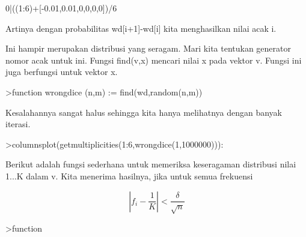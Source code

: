 \documentclass[a4paper,10pt]{article}
\begin{document}
\begin{eulernotebook}
\begin{eulercomment}
\begin{eulercomment}
\begin{eulercomment}
\begin{eulercomment}
\begin{eulercomment}
\begin{eulercomment}
\begin{eulercomment}
\begin{eulercomment}
\begin{eulercomment}
\begin{eulercomment}
\begin{eulercomment}
\begin{eulercomment}
\begin{eulercomment}
\begin{eulercomment}
\begin{eulercomment}
\begin{eulercomment}
\begin{eulercomment}
\begin{eulercomment}
\begin{eulercomment}
\begin{eulercomment}
\begin{eulercomment}
\begin{eulercomment}
\begin{eulercomment}
\begin{eulercomment}
\begin{eulercomment}
\begin{eulercomment}
\begin{eulercomment}
\begin{eulercomment}
\begin{eulercomment}
\begin{eulercomment}
\begin{eulercomment}
\begin{eulercomment}
\begin{eulercomment}
\begin{eulercomment}
\begin{eulercomment}
\begin{eulercomment}
\begin{eulercomment}
\begin{eulercomment}
\begin{eulercomment}
\begin{eulercomment}
\begin{eulercomment}
\begin{eulercomment}
\begin{eulercomment}
\begin{eulercomment}
\begin{eulercomment}
\begin{eulercomment}
\begin{eulercomment}
\begin{eulercomment}
\begin{eulercomment}
\begin{eulercomment}
\begin{eulercomment}
\begin{eulercomment}
\begin{eulercomment}
\begin{eulercomment}
\begin{eulercomment}
\begin{eulercomment}
\begin{eulercomment}
\begin{eulercomment}
\begin{eulercomment}
\begin{eulercomment}
\begin{eulercomment}
\begin{eulercomment}
\begin{eulercomment}
\begin{eulercomment}
\begin{eulercomment}
\begin{eulercomment}
\begin{eulerprompt}
0|((1:6)+[-0.01,0.01,0,0,0,0])/6
\end{eulerprompt}
\begin{euleroutput}
  [0,  0.165,  0.335,  0.5,  0.666667,  0.833333,  1]
\end{euleroutput}
\begin{eulercomment}
Artinya dengan probabilitas wd[i+1]-wd[i] kita menghasilkan nilai acak
i.

Ini hampir merupakan distribusi yang seragam. Mari kita tentukan
generator nomor acak untuk ini. Fungsi find(v,x) mencari nilai x pada
vektor v. Fungsi ini juga berfungsi untuk vektor x.
\end{eulercomment}
\begin{eulerprompt}
>function wrongdice (n,m) := find(wd,random(n,m))
\end{eulerprompt}
\begin{eulercomment}
Kesalahannya sangat halus sehingga kita hanya melihatnya dengan banyak
iterasi.
\end{eulercomment}
\begin{eulerprompt}
>columnsplot(getmultiplicities(1:6,wrongdice(1,1000000))):
\end{eulerprompt}
\begin{eulercomment}
Berikut adalah fungsi sederhana untuk memeriksa keseragaman distribusi
nilai 1...K dalam v. Kita menerima hasilnya, jika untuk semua
frekuensi

\end{eulercomment}
\begin{eulerformula}
\[
\left|f_i-\frac{1}{K}\right| < \frac{\delta}{\sqrt{n}}
\]
\end{eulerformula}
\begin{eulerprompt}
>function 
\end{eulerprompt}
\end{eulercomment}
\end{eulercomment}
\end{eulercomment}
\end{eulercomment}
\end{eulercomment}
\end{eulercomment}
\end{eulercomment}
\end{eulercomment}
\end{eulercomment}
\end{eulercomment}
\end{eulercomment}
\end{eulercomment}
\end{eulercomment}
\end{eulercomment}
\end{eulercomment}
\end{eulercomment}
\end{eulercomment}
\end{eulercomment}
\end{eulercomment}
\end{eulercomment}
\end{eulercomment}
\end{eulercomment}
\end{eulercomment}
\end{eulercomment}
\end{eulercomment}
\end{eulercomment}
\end{eulercomment}
\end{eulercomment}
\end{eulercomment}
\end{eulercomment}
\end{eulercomment}
\end{eulercomment}
\end{eulercomment}
\end{eulercomment}
\end{eulercomment}
\end{eulercomment}
\end{eulercomment}
\end{eulercomment}
\end{eulercomment}
\end{eulercomment}
\end{eulercomment}
\end{eulercomment}
\end{eulercomment}
\end{eulercomment}
\end{eulercomment}
\end{eulercomment}
\end{eulercomment}
\end{eulercomment}
\end{eulercomment}
\end{eulercomment}
\end{eulercomment}
\end{eulercomment}
\end{eulercomment}
\end{eulercomment}
\end{eulercomment}
\end{eulercomment}
\end{eulercomment}
\end{eulercomment}
\end{eulercomment}
\end{eulercomment}
\end{eulercomment}
\end{eulercomment}
\end{eulercomment}
\end{eulercomment}
\end{eulercomment}
\end{eulercomment}
\end{eulernotebook}
\end{document}
